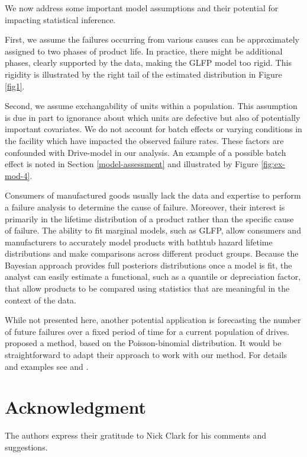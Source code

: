 \documentclass[aoas]{imsart}
\begin{document}
We now address some important model assumptions and their potential for impacting statistical inference. 

First, we assume the failures occurring from various causes can be approximately assigned to two phases of product life.  In practice, there might be additional phases, clearly supported by the data, making the GLFP model too rigid. This rigidity is illustrated by the right tail of the estimated distribution in Figure \ref{fig1}.

Second, we assume exchangability of units within a population. This assumption is due in part to ignorance about which units are defective but also of potentially important covariates. We do not account for batch effects or varying conditions in the facility which have impacted the observed failure rates. These factors are confounded with Drive-model in our analysis. An example of a possible batch effect is noted in Section \ref{model-assessment} and illustrated by Figure \ref{fig:ex-mod-4}. 

Consumers of manufactured goods usually lack the data and expertise to perform a failure analysis to determine the cause of failure.  Moreover, their interest is primarily in the lifetime distribution of a product rather than the specific cause of failure.  The ability to fit marginal models, such as GLFP, allow consumers and manufacturers to accurately model products with bathtub hazard lifetime distributions and make comparisons across different product groups.  Because the Bayesian approach provides full posteriors distributions once a model is fit, the analyst can easily estimate a functional, such as a quantile or depreciation factor, that allow products to be compared using statistics that are meaningful in the context of the data. 

While not presented here, another potential application is forecasting the number of future failures over a fixed period of time for a current population of drives. \citet{hmm} proposed a method, based on the Poisson-binomial distribution. It would be straightforward to adapt their approach to work with our method. For details and examples see \citet[Sect.~6]{hmm} and \citet{xu2015assessing}.

\section*{Acknowledgment}    
The authors express their gratitude to Nick Clark for his comments and suggestions.
\end{document}
